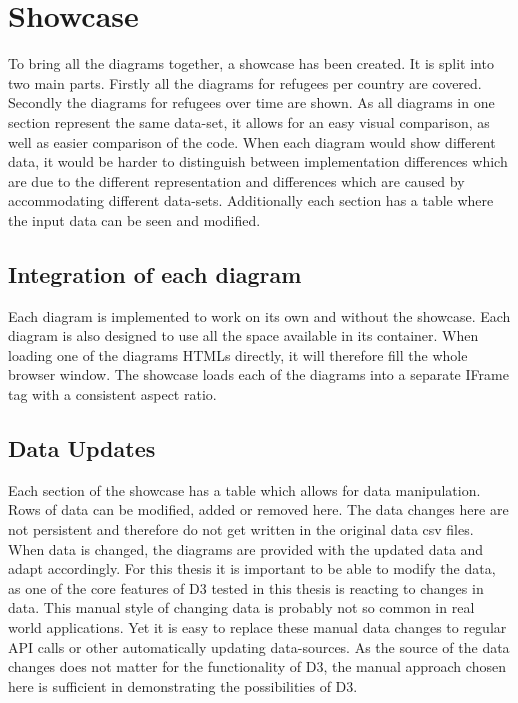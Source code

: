 \section{Showcase}

To bring all the diagrams together, a showcase has been created. It  is split into two main parts. Firstly all the diagrams for refugees per country are covered. Secondly the diagrams for refugees over time are shown. As all diagrams in one section represent the same data-set, it allows for an easy visual comparison, as well as easier comparison of the code. When each diagram would show different data, it would be harder to distinguish between implementation differences which are due to the different representation and differences which are caused by accommodating different data-sets. Additionally each section has a table where the input data can be seen and modified.

\subsection{Integration of each diagram}

Each diagram is implemented to work on its own and without the showcase. Each diagram is also designed to use all the space available in its container. When loading one of the diagrams HTMLs directly, it will therefore fill the whole browser window. The showcase loads each of the diagrams into a separate IFrame tag with a consistent aspect ratio.

\subsection{Data Updates}

Each section of the showcase has a table which allows for data manipulation. Rows of data can be modified, added or removed here. The data changes here are not persistent and therefore do not get written in the original data csv files. When data is changed, the diagrams are provided with the updated data and adapt accordingly. For this thesis it is important to be able to modify the data, as one of the core features of D3 tested in this thesis is reacting to changes in data. This manual style of changing data is probably not so common in real world applications. Yet it is easy to replace these manual data changes to regular API calls or other automatically updating data-sources. As the source of the data changes does not matter for the functionality of D3, the manual approach chosen here is sufficient in demonstrating the possibilities of D3.
